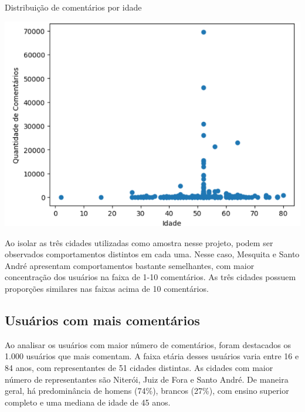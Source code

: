 \begin{quadro}[!htb]
	\caption{Distribuição de comentários por idade}
	\label{fig:colab_comments_by_age}
	\centering
	\includegraphics[scale=0.8]{images/colab_comments_by_age.png}
\end{quadro}

Ao isolar as três cidades utilizadas como amostra nesse projeto, podem ser observados comportamentos distintos em cada uma. Nesse caso, Mesquita e Santo André apresentam comportamentos bastante semelhantes, com maior concentração dos usuários na faixa de 1-10 comentários. As três cidades possuem proporções similares nas faixas acima de 10 comentários.

\subsection*{Usuários com mais comentários}

Ao analisar os usuários com maior número de comentários, foram destacados os 1.000 usuários que mais comentam. A faixa etária desses usuários varia entre 16 e 84 anos, com representantes de 51 cidades distintas. As cidades com maior número de representantes são Niterói, Juiz de Fora e Santo André. De maneira geral, há predominância de homens (74\%), brancos (27\%), com ensino superior completo e uma mediana de idade de 45 anos.

